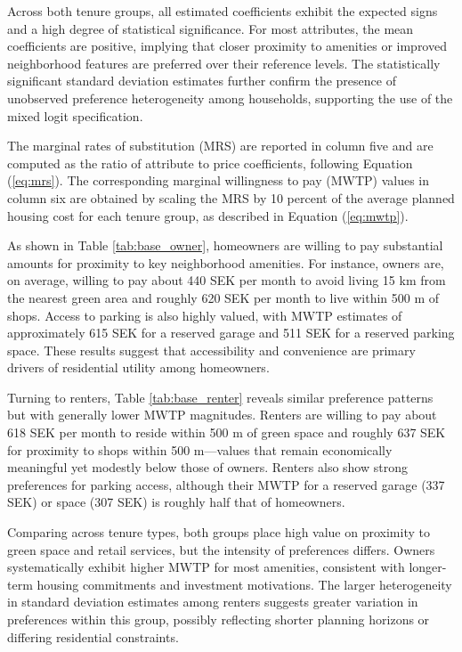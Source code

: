 \documentclass[3p,11pt ]{elsarticle}
\begin{document}
%

Across both tenure groups, all estimated coefficients exhibit the expected signs and a high degree of statistical significance. For most attributes, the mean coefficients are positive, implying that closer proximity to amenities or improved neighborhood features are preferred over their reference levels. The statistically significant standard deviation estimates further confirm the presence of unobserved preference heterogeneity among households, supporting the use of the mixed logit specification.

The marginal rates of substitution (MRS) are reported in column five and are computed as the ratio of attribute to price coefficients, following Equation (\ref{eq:mrs}). The corresponding marginal willingness to pay (MWTP) values in column six are obtained by scaling the MRS by 10 percent of the average planned housing cost for each tenure group, as described in Equation (\ref{eq:mwtp}).

As shown in Table \ref{tab:base_owner}, homeowners are willing to pay substantial amounts for proximity to key neighborhood amenities. For instance, owners are, on average, willing to pay about 440 SEK per month to avoid living 15 km from the nearest green area and roughly 620 SEK per month to live within 500 m of shops. Access to parking is also highly valued, with MWTP estimates of approximately 615 SEK for a reserved garage and 511 SEK for a reserved parking space. These results suggest that accessibility and convenience are primary drivers of residential utility among homeowners.

%

Turning to renters, Table \ref{tab:base_renter} reveals similar preference patterns but with generally lower MWTP magnitudes. Renters are willing to pay about 618 SEK per month to reside within 500 m of green space and roughly 637 SEK for proximity to shops within 500 m—values that remain economically meaningful yet modestly below those of owners. Renters also show strong preferences for parking access, although their MWTP for a reserved garage (337 SEK) or space (307 SEK) is roughly half that of homeowners.

Comparing across tenure types, both groups place high value on proximity to green space and retail services, but the intensity of preferences differs. Owners systematically exhibit higher MWTP for most amenities, consistent with longer-term housing commitments and investment motivations. The larger heterogeneity in standard deviation estimates among renters suggests greater variation in preferences within this group, possibly reflecting shorter planning horizons or differing residential constraints.
\end{document}
